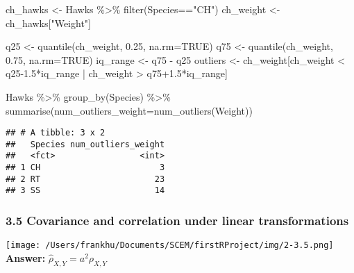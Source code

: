 \documentclass[
]{article}
\newenvironment{Shaded}{\begin{snugshade}}{\end{snugshade}}
\newcommand{\AttributeTok}[1]{\textcolor[rgb]{0.77,0.63,0.00}{#1}}
\newcommand{\ConstantTok}[1]{\textcolor[rgb]{0.00,0.00,0.00}{#1}}
\newcommand{\FloatTok}[1]{\textcolor[rgb]{0.00,0.00,0.81}{#1}}
\newcommand{\FunctionTok}[1]{\textcolor[rgb]{0.00,0.00,0.00}{#1}}
\newcommand{\NormalTok}[1]{#1}
\newcommand{\OtherTok}[1]{\textcolor[rgb]{0.56,0.35,0.01}{#1}}
\newcommand{\SpecialCharTok}[1]{\textcolor[rgb]{0.00,0.00,0.00}{#1}}
\newcommand{\StringTok}[1]{\textcolor[rgb]{0.31,0.60,0.02}{#1}}
\begin{document}
\begin{Shaded}
\begin{Highlighting}[]
\NormalTok{ch\_hawks }\OtherTok{\textless{}{-}}\NormalTok{ Hawks }\SpecialCharTok{\%\textgreater{}\%} \FunctionTok{filter}\NormalTok{(Species}\SpecialCharTok{==}\StringTok{"CH"}\NormalTok{)}
\NormalTok{ch\_weight }\OtherTok{\textless{}{-}}\NormalTok{ ch\_hawks[}\StringTok{"Weight"}\NormalTok{]}

\NormalTok{q25 }\OtherTok{\textless{}{-}} \FunctionTok{quantile}\NormalTok{(ch\_weight, }\FloatTok{0.25}\NormalTok{, }\AttributeTok{na.rm=}\ConstantTok{TRUE}\NormalTok{)}
\NormalTok{q75 }\OtherTok{\textless{}{-}} \FunctionTok{quantile}\NormalTok{(ch\_weight, }\FloatTok{0.75}\NormalTok{, }\AttributeTok{na.rm=}\ConstantTok{TRUE}\NormalTok{)}
\NormalTok{iq\_range }\OtherTok{\textless{}{-}}\NormalTok{ q75 }\SpecialCharTok{{-}}\NormalTok{ q25}
\NormalTok{outliers }\OtherTok{\textless{}{-}}\NormalTok{ ch\_weight[ch\_weight }\SpecialCharTok{\textless{}}\NormalTok{ q25}\FloatTok{{-}1.5}\SpecialCharTok{*}\NormalTok{iq\_range }\SpecialCharTok{|}\NormalTok{ ch\_weight }\SpecialCharTok{\textgreater{}}\NormalTok{ q75}\FloatTok{+1.5}\SpecialCharTok{*}\NormalTok{iq\_range]}
\end{Highlighting}
\end{Shaded}

\begin{Shaded}
\begin{Highlighting}[]
\NormalTok{Hawks }\SpecialCharTok{\%\textgreater{}\%} \FunctionTok{group\_by}\NormalTok{(Species) }\SpecialCharTok{\%\textgreater{}\%} \FunctionTok{summarise}\NormalTok{(}\AttributeTok{num\_outliers\_weight=}\FunctionTok{num\_outliers}\NormalTok{(Weight))}
\end{Highlighting}
\end{Shaded}

\begin{verbatim}
## # A tibble: 3 x 2
##   Species num_outliers_weight
##   <fct>                 <int>
## 1 CH                        3
## 2 RT                       23
## 3 SS                       14
\end{verbatim}

\hypertarget{covariance-and-correlation-under-linear-transformations}{%
\subsubsection{3.5 Covariance and correlation under linear
transformations}\label{covariance-and-correlation-under-linear-transformations}}

\texttt{[image: /Users/frankhu/Documents/SCEM/firstRProject/img/2-3.5.png]}
\textbf{Answer:} \(\hat\rho_{X, Y}=a^2\rho_{X,Y}\)
\end{document}
